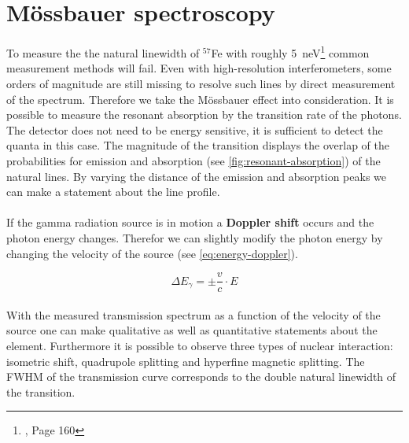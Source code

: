 
\section{Mössbauer spectroscopy}
\label{sec:mössbauer-spectroscopy}

To measure the the natural linewidth of $^{57}$Fe with roughly \SI{5}{\nano\electronvolt}\footnote{\cite{Sch17}, Page 160} common measurement methods will fail. Even with high-resolution interferometers, some orders of magnitude are still missing to resolve such lines by direct measurement of the spectrum. 
Therefore we take the Mössbauer effect into consideration. It is possible to measure the resonant absorption by the transition rate of the photons. 
The detector does not need to be energy sensitive, it is sufficient to detect the quanta in this case. The magnitude of the transition displays the overlap of the probabilities for emission and absorption (see \autoref{fig:resonant-absorption}) of the natural lines. 
By varying the distance of the emission and absorption peaks we can make a statement about the line profile. \\
\\
If the gamma radiation source is in motion a \textbf{Doppler shift} occurs and the photon energy changes. Therefor we can slightly modify the photon energy by changing the velocity of the source (see  \autoref{eq:energy-doppler}). 

\begin{equation}
    \Delta E_{\gamma} = \pm \frac{v}{c} \cdot E
    \label{eq:energy-doppler}
\end{equation}
\\
With the measured transmission spectrum as a function of the velocity of the source one can make qualitative as well as quantitative statements about the element. 
Furthermore it is possible to observe three types of nuclear interaction: isometric shift, quadrupole splitting and hyperfine magnetic splitting. 
The FWHM of the transmission curve corresponds to the double natural linewidth of the transition.